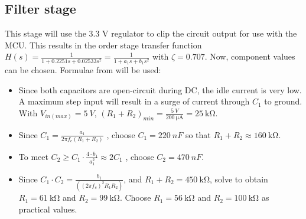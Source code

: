 \subsection{Filter stage}{\label{rangeSensor_filterDesign}}

This stage will use the 3.3 V regulator to clip the circuit output for use with the MCU.
This results in the  order stage transfer function $H(s) = \frac{1}{1 + 0.2251 s + 0.02533 s^2} = \frac{1}{1 + a_1 s + b_1 s^2}$ with $\zeta = 0.707$. Now, component values can be chosen.
Formulae from \cite{filterDesign} will be used:

\begin{itemize}
  \item Since both capacitors are open-circuit during DC, the idle current is very low. A maximum step input will result in a surge of current through $C_1$ to ground.
        With $V_{in(max)} = \SI{5}{V}$, $(R_1 + R_2)_{min} = \frac{\SI{5}{V}}{\SI{200}{\micro\ampere}} = \SI{25}{\kilo\ohm}$.
  \item Since $C_1 = \frac{a_1}{2 \pi f_c (R_1 + R_2)}$ \cite{filterDesign}, choose $C_1 = \SI{220}{nF}$ so that $R_1 + R_2 \approx \SI{160}{\kilo\ohm}$.
  \item To meet $C_2 \geq C_1 \cdot \frac{4 \cdot b_1}{a_1 ^2} \approx 2 C_1 $ \cite{filterDesign}, choose $C_2 = \SI{470}{nF}$.
  \item Since $C_1 \cdot C_2 = \frac{b_1}{((2 \pi f_c)^2 R_1 R_2)}$, and $R_1 + R_2 = \SI{450}{\kilo\ohm}$, solve to obtain $R_1 = \SI{61}{\kilo\ohm}$ and $R_2 = \SI{99}{\kilo\ohm}$.
        Choose $R_1 = \SI{56}{\kilo\ohm}$ and $R_2 = \SI{100}{\kilo\ohm}$ as practical values.
\end{itemize}